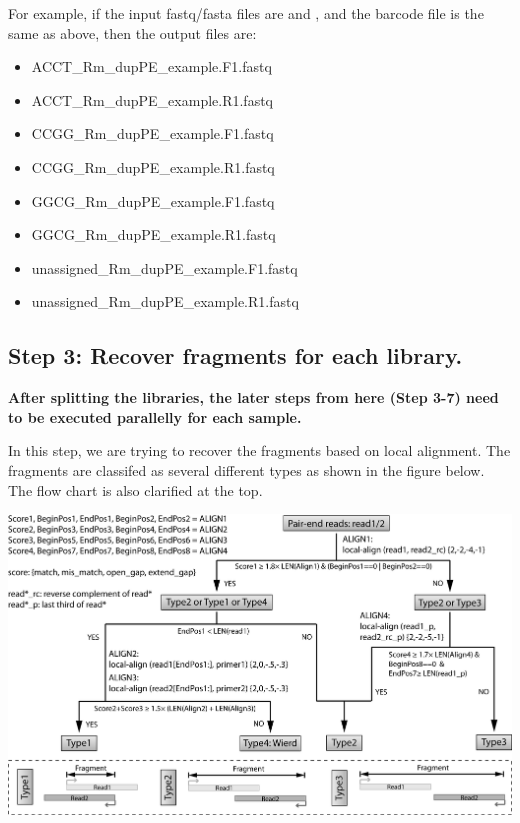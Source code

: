 \documentclass[letterpaper,10pt,english]{sphinxmanual}
\begin{document}
For example, if the input fastq/fasta files are  and , and the barcode file is the same as above, then the output files are:
\begin{itemize}
\item {} 
ACCT\_Rm\_dupPE\_example.F1.fastq

\item {} 
ACCT\_Rm\_dupPE\_example.R1.fastq

\item {} 
CCGG\_Rm\_dupPE\_example.F1.fastq

\item {} 
CCGG\_Rm\_dupPE\_example.R1.fastq

\item {} 
GGCG\_Rm\_dupPE\_example.F1.fastq

\item {} 
GGCG\_Rm\_dupPE\_example.R1.fastq

\item {} 
unassigned\_Rm\_dupPE\_example.F1.fastq

\item {} 
unassigned\_Rm\_dupPE\_example.R1.fastq

\end{itemize}


\subsection{Step 3: Recover fragments for each library.}
\label{Analysis_pipeline:step-3-recover-fragments-for-each-library}\label{Analysis_pipeline:step3}
\textbf{After splitting the libraries, the later steps from here (Step 3-7) need to be executed parallelly for each sample.}

In this step, we are trying to recover the fragments based on local alignment. The fragments are classifed as several different types as shown in the figure below. The flow chart is also clarified at the top.

{\hfill\includegraphics{workflow_for_recoverFragment.jpg}\hfill}
\end{document}
